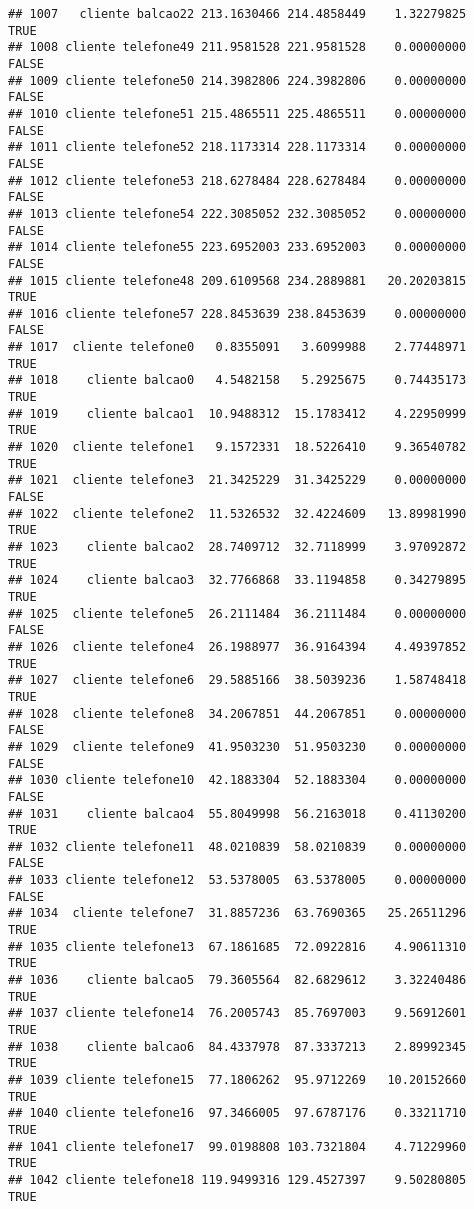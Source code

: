 \documentclass[
]{article}
\begin{document}
\begin{verbatim}
## 1007   cliente balcao22 213.1630466 214.4858449    1.32279825     TRUE
## 1008 cliente telefone49 211.9581528 221.9581528    0.00000000    FALSE
## 1009 cliente telefone50 214.3982806 224.3982806    0.00000000    FALSE
## 1010 cliente telefone51 215.4865511 225.4865511    0.00000000    FALSE
## 1011 cliente telefone52 218.1173314 228.1173314    0.00000000    FALSE
## 1012 cliente telefone53 218.6278484 228.6278484    0.00000000    FALSE
## 1013 cliente telefone54 222.3085052 232.3085052    0.00000000    FALSE
## 1014 cliente telefone55 223.6952003 233.6952003    0.00000000    FALSE
## 1015 cliente telefone48 209.6109568 234.2889881   20.20203815     TRUE
## 1016 cliente telefone57 228.8453639 238.8453639    0.00000000    FALSE
## 1017  cliente telefone0   0.8355091   3.6099988    2.77448971     TRUE
## 1018    cliente balcao0   4.5482158   5.2925675    0.74435173     TRUE
## 1019    cliente balcao1  10.9488312  15.1783412    4.22950999     TRUE
## 1020  cliente telefone1   9.1572331  18.5226410    9.36540782     TRUE
## 1021  cliente telefone3  21.3425229  31.3425229    0.00000000    FALSE
## 1022  cliente telefone2  11.5326532  32.4224609   13.89981990     TRUE
## 1023    cliente balcao2  28.7409712  32.7118999    3.97092872     TRUE
## 1024    cliente balcao3  32.7766868  33.1194858    0.34279895     TRUE
## 1025  cliente telefone5  26.2111484  36.2111484    0.00000000    FALSE
## 1026  cliente telefone4  26.1988977  36.9164394    4.49397852     TRUE
## 1027  cliente telefone6  29.5885166  38.5039236    1.58748418     TRUE
## 1028  cliente telefone8  34.2067851  44.2067851    0.00000000    FALSE
## 1029  cliente telefone9  41.9503230  51.9503230    0.00000000    FALSE
## 1030 cliente telefone10  42.1883304  52.1883304    0.00000000    FALSE
## 1031    cliente balcao4  55.8049998  56.2163018    0.41130200     TRUE
## 1032 cliente telefone11  48.0210839  58.0210839    0.00000000    FALSE
## 1033 cliente telefone12  53.5378005  63.5378005    0.00000000    FALSE
## 1034  cliente telefone7  31.8857236  63.7690365   25.26511296     TRUE
## 1035 cliente telefone13  67.1861685  72.0922816    4.90611310     TRUE
## 1036    cliente balcao5  79.3605564  82.6829612    3.32240486     TRUE
## 1037 cliente telefone14  76.2005743  85.7697003    9.56912601     TRUE
## 1038    cliente balcao6  84.4337978  87.3337213    2.89992345     TRUE
## 1039 cliente telefone15  77.1806262  95.9712269   10.20152660     TRUE
## 1040 cliente telefone16  97.3466005  97.6787176    0.33211710     TRUE
## 1041 cliente telefone17  99.0198808 103.7321804    4.71229960     TRUE
## 1042 cliente telefone18 119.9499316 129.4527397    9.50280805     TRUE

\end{verbatim}
\end{document}
